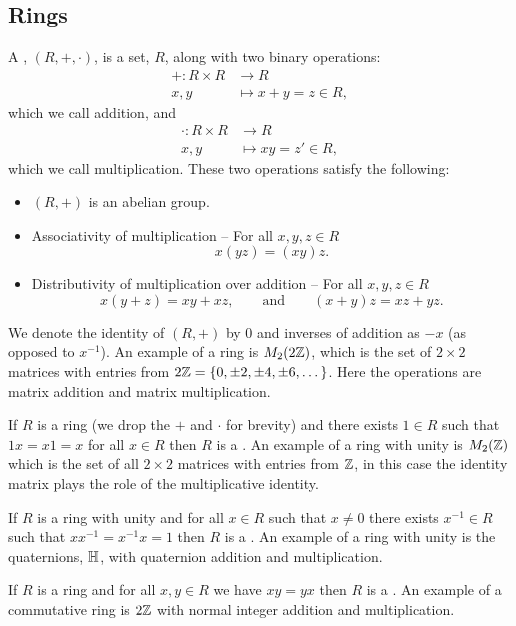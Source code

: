     \subsection{Rings}
    A , \((R, +, \cdot)\), is a set, \(R\), along with two binary operations:
    \begin{align*}
        +\colon R\times R &\to R\\
        x, y &\mapsto x + y = z\in R,
    \end{align*}
    which we call addition, and
    \begin{align*}
        \cdot\colon R\times R &\to R\\
        x, y &\mapsto xy = z'\in R,
    \end{align*}
    which we call multiplication.
    These two operations satisfy the following:
    \begin{itemize}
        \item \((R, +)\) is an abelian group.
        \item Associativity of multiplication -- For all \(x, y, z\in R\)
        \[x(yz) = (xy)z.\]
        \item Distributivity of multiplication over addition -- For all \(x, y, z\in R\)
        \[x(y + z) = xy + xz,\qquad\text{and}\qquad (x + y)z = xz + yz.\]
    \end{itemize}
    We denote the identity of \((R, +)\) by \(0\) and inverses of addition as \(-x\) (as opposed to \(x^{-1}\)).
    An example of a ring is \(M_2(2\mathbb{Z})\), which is the set of \(2\times 2\) matrices with entries from \(2\mathbb{Z} = \{0, \pm 2, \pm 4, \pm 6, \dotsc\}\).
    Here the operations are matrix addition and matrix multiplication.
    
    
    If \(R\) is a ring (we drop the \(+\) and \(\cdot\) for brevity) and there exists \(1\in R\) such that \(1x = x1 = x\) for all \(x\in R\) then \(R\) is a .
    An example of a ring with unity is \(M_2(\mathbb{Z})\) which is the set of all \(2\times 2\) matrices with entries from \(\mathbb{Z}\), in this case the identity matrix plays the role of the multiplicative identity.
    
    If \(R\) is a ring with unity and for all \(x\in R\) such that \(x\ne 0\) there exists \(x^{-1}\in R\) such that \(xx^{-1} = x^{-1}x = 1\) then \(R\) is a .
    An example of a ring with unity is the quaternions, \(\mathbb{H}\), with quaternion addition and multiplication.
    
    If \(R\) is a ring and for all \(x, y\in R\) we have \(xy = yx\) then \(R\) is a .
    An example of a commutative ring is \(2\mathbb{Z}\) with normal integer addition and multiplication.
    
